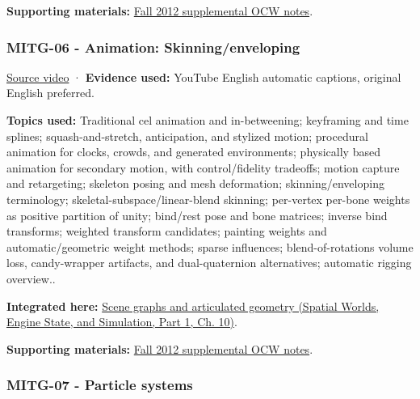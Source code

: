 \textbf{Supporting materials:} \href{https://ocw.mit.edu/courses/6-837-computer-graphics-fall-2012/pages/lecture-notes/}{Fall 2012 supplemental OCW notes}.

\subsubsection{MITG-06 - Animation: Skinning/enveloping}\label{04-visual-computing-ii-ch036-mitg-06---animation-skinningenveloping}

\hypertarget{04-visual-computing-ii-ch036-mitg-06---animation-skinningenveloping}{}

\href{https://www.youtube.com/watch?v=oAQkIAGKvUI}{Source video} · \textbf{Evidence used:} YouTube English automatic captions, original English preferred.

\textbf{Topics used:} Traditional cel animation and in-betweening; keyframing and time splines; squash-and-stretch, anticipation, and stylized motion; procedural animation for clocks, crowds, and generated environments; physically based animation for secondary motion, with control/fidelity tradeoffs; motion capture and retargeting; skeleton posing and mesh deformation; skinning/enveloping terminology; skeletal-subspace/linear-blend skinning; per-vertex per-bone weights as positive partition of unity; bind/rest pose and bone matrices; inverse bind transforms; weighted transform candidates; painting weights and automatic/geometric weight methods; sparse influences; blend-of-rotations volume loss, candy-wrapper artifacts, and dual-quaternion alternatives; automatic rigging overview..

\textbf{Integrated here:} \href{../05-Spatial-Worlds-Engine-State-and-Simulation-P01/main.pdf\#nameddest=04-visual-computing-ii-ch029-scene-graphs-and-articulated-geometry}{Scene graphs and articulated geometry (Spatial Worlds, Engine State, and Simulation, Part 1, Ch. 10)}.

\textbf{Supporting materials:} \href{https://ocw.mit.edu/courses/6-837-computer-graphics-fall-2012/pages/lecture-notes/}{Fall 2012 supplemental OCW notes}.

\subsubsection{MITG-07 - Particle systems}\label{04-visual-computing-ii-ch036-mitg-07---particle-systems}

\hypertarget{04-visual-computing-ii-ch036-mitg-07---particle-systems}{}

